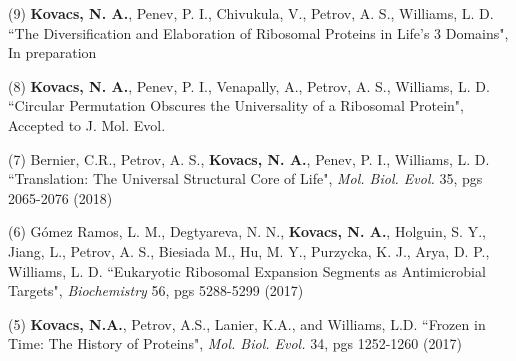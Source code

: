

\begin{cvpublications}


\cvpublication
{(9) {\bf Kovacs, N. A.}, Penev, P. I., Chivukula, V., Petrov, A. S., Williams, L. D. ``The Diversification and Elaboration of Ribosomal Proteins in Life’s 3 Domains", In preparation}
\vspace{-4.0mm}


{(8) {\bf Kovacs, N. A.}, Penev, P. I., Venapally, A., Petrov, A. S., Williams, L. D. ``Circular Permutation Obscures the Universality of a Ribosomal Protein", Accepted to J. Mol. Evol.}


{(7) Bernier, C.R., Petrov, A. S., {\bf Kovacs, N. A.},  Penev, P. I., Williams, L. D. ``Translation: The Universal Structural Core of Life", \textit{Mol. Biol. Evol.} 35, pgs 2065-2076 (2018)}


{(6) G{\'o}mez Ramos, L. M., Degtyareva, N. N., {\bf Kovacs, N. A.}, Holguin, S. Y., Jiang, L., Petrov, A. S., Biesiada M., Hu, M. Y., Purzycka, K. J., Arya, D. P., Williams, L. D. ``Eukaryotic Ribosomal Expansion Segments as Antimicrobial Targets", \textit{Biochemistry} 56, pgs 5288-5299 (2017)}


\cvpublication
{(5) {\bf Kovacs, N.A.}, Petrov, A.S., Lanier, K.A., and Williams, L.D. ``Frozen in Time: The History of Proteins", \textit{Mol. Biol. Evol.} 34, pgs 1252-1260 (2017)}
\vspace{-4.0mm}


\end{cvpublications}

